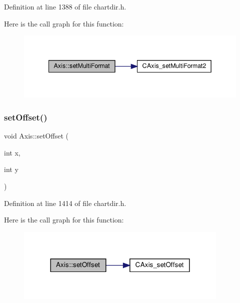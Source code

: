 Definition at line 1388 of file chartdir.\+h.

Here is the call graph for this function\+:
\nopagebreak
\begin{figure}[H]
\begin{center}
\leavevmode
\includegraphics[width=342pt]{class_axis_aa4b46e028226064bcc5f720ba04a9e08_cgraph}
\end{center}
\end{figure}
\mbox{\label{class_axis_a041e7ea566969e09175978fa4ae42406}} 
\subsubsection{\texorpdfstring{set\+Offset()}{setOffset()}}
{\footnotesize\ttfamily void Axis\+::set\+Offset (\begin{DoxyParamCaption}\item[{int}]{x,  }\item[{int}]{y }\end{DoxyParamCaption})\hspace{0.3cm}{\ttfamily [inline]}}



Definition at line 1414 of file chartdir.\+h.

Here is the call graph for this function\+:
\nopagebreak
\begin{figure}[H]
\begin{center}
\leavevmode
\includegraphics[width=288pt]{class_axis_a041e7ea566969e09175978fa4ae42406_cgraph}
\end{center}
\end{figure}
\mbox{\label{class_axis_ab18969dbb7b9f59e170b7b5e72c4208e}} 
